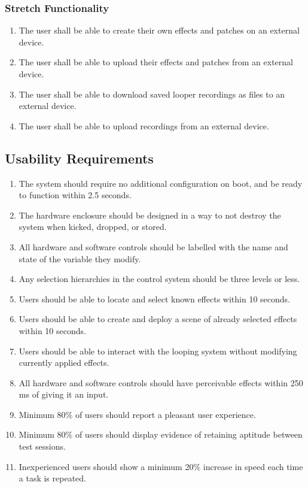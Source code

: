     \subsubsection{Stretch Functionality}
    \begin{enumerate}[label=\alph*.]
        \item The user shall be able to create their own effects and patches on an external device.
        \item The user shall be able to upload their effects and patches from an external device.
        \item The user shall be able to download saved looper recordings as files to an external device.
        \item The user shall be able to upload recordings from an external device.
    \end{enumerate}

\subsection{Usability Requirements}
    \begin{enumerate}[label=\alph*.]
        \item The system should require no additional configuration on boot, and be ready to function within 2.5 seconds. %
        \item The hardware enclosure should be designed in a way to not destroy the system when kicked, dropped, or stored. %
        \item All hardware and software controls should be labelled with the name and state of the variable they modify.
        \item Any selection hierarchies in the control system should be three levels or less.
        \item Users should be able to locate and select known effects within 10 seconds. %
        \item Users should be able to create and deploy a scene of already selected effects within 10 seconds.
        \item Users should be able to interact with the looping system without modifying currently applied effects.
        \item All hardware and software controls should have perceivable effects within 250 ms of giving it an input.
        \item Minimum 80\% of users should report a pleasant user experience.
        \item Minimum 80\% of users should display evidence of retaining aptitude between test sessions.
        \item Inexperienced users should show a minimum 20\% increase in speed each time a task is repeated.
        
    \end{enumerate}

